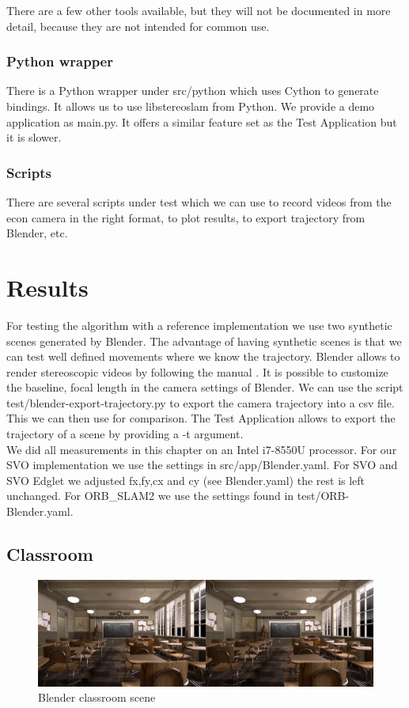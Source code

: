 \documentclass[11pt,a4paper,titlepage,oneside]{report}
\begin{document}
There are a few other tools available, but they will not be documented in more detail, because they are not intended for common use.

\subsection{Python wrapper}
There is a Python wrapper under src/python which uses Cython to generate bindings. It allows us to use libstereoslam from Python. We provide a demo application as main.py. It offers a similar feature set as the Test Application but it is slower.

\subsection{Scripts}
There are several scripts under test which we can use to record videos from the econ camera in the right format, to plot results, to export trajectory from Blender, etc.

\chapter{Results}\label{ch:results}

For testing the algorithm with a reference implementation we use two synthetic scenes generated by Blender. The advantage of having synthetic scenes is that we can test well defined movements where we know the trajectory. Blender allows to render stereoscopic videos by following the manual \cite{blender_stereo}. It is possible to customize the baseline, focal length in the camera settings of Blender. We can use the script test/blender-export-trajectory.py to export the camera trajectory into a csv file. This we can then use for comparison. The Test Application allows to export the trajectory of a scene by providing a -t argument.\\
We did all measurements in this chapter on an Intel i7-8550U processor. For our SVO implementation we use the settings in src/app/Blender.yaml. For SVO and SVO Edglet we adjusted fx,fy,cx and cy (see Blender.yaml) the rest is left unchanged. For ORB\_SLAM2 we use the settings found in test/ORB-Blender.yaml.

\section{Classroom}
\begin{figure}[H]
  \centering
  \includegraphics[width=1.0\textwidth]{img/blender_classroom_scene.png}
  \caption{Blender classroom scene}\label{fig:blender_classroom_scene}
\end{figure}
\end{document}
